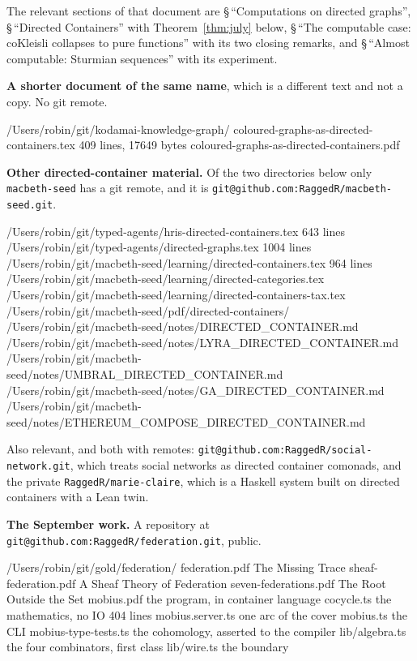 \documentclass[11pt,a4paper]{article}
\begin{document}
The relevant sections of that document are \S\,``Computations on directed
graphs'', \S\,``Directed Containers'' with Theorem~\ref{thm:july} below,
\S\,``The computable case: coKleisli collapses to pure functions'' with its two
closing remarks, and \S\,``Almost computable: Sturmian sequences'' with its
experiment.

\medskip
\textbf{A shorter document of the same name}, which is a different text and not
a copy. No git remote.

\begin{term}
/Users/robin/git/kodamai-knowledge-graph/
    coloured-graphs-as-directed-containers.tex      409 lines,  17649 bytes
    coloured-graphs-as-directed-containers.pdf
\end{term}

\medskip
\textbf{Other directed-container material.} Of the two directories below only
\texttt{macbeth-seed} has a git remote, and it is
\texttt{git@github.com:RaggedR/macbeth-seed.git}\@.

\begin{term}
/Users/robin/git/typed-agents/hris-directed-containers.tex      643 lines
/Users/robin/git/typed-agents/directed-graphs.tex              1004 lines
/Users/robin/git/macbeth-seed/learning/directed-containers.tex  964 lines
/Users/robin/git/macbeth-seed/learning/directed-categories.tex
/Users/robin/git/macbeth-seed/learning/directed-containers-tax.tex
/Users/robin/git/macbeth-seed/pdf/directed-containers/
/Users/robin/git/macbeth-seed/notes/DIRECTED_CONTAINER.md
/Users/robin/git/macbeth-seed/notes/LYRA_DIRECTED_CONTAINER.md
/Users/robin/git/macbeth-seed/notes/UMBRAL_DIRECTED_CONTAINER.md
/Users/robin/git/macbeth-seed/notes/GA_DIRECTED_CONTAINER.md
/Users/robin/git/macbeth-seed/notes/ETHEREUM_COMPOSE_DIRECTED_CONTAINER.md
\end{term}

Also relevant, and both with remotes:
\texttt{git@github.com:RaggedR/social-network.git}, which treats social networks
as directed container comonads, and the private \texttt{RaggedR/marie-claire},
which is a Haskell system built on directed containers with a Lean twin.

\medskip
\textbf{The September work.} A repository at
\texttt{git@github.com:RaggedR/federation.git}, public.

\begin{term}
/Users/robin/git/gold/federation/
    federation.pdf            The Missing Trace
    sheaf-federation.pdf      A Sheaf Theory of Federation
    seven-federations.pdf     The Root Outside the Set
    mobius.pdf                the program, in container language
    cocycle.ts                the mathematics, no IO           404 lines
    mobius.server.ts          one arc of the cover
    mobius.ts                 the CLI
    mobius-type-tests.ts      the cohomology, asserted to the compiler
    lib/algebra.ts            the four combinators, first class
    lib/wire.ts               the boundary
\end{term}
\end{document}
